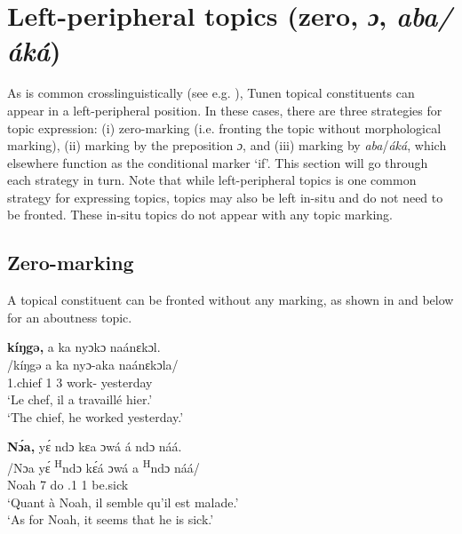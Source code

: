 \documentclass[output=paper,colorlinks,citecolor=brown
]{langscibook}
\begin{document}
\section{Left-peripheral topics (zero, \textit{ɔ},  \textit{aba/áká})}\label{sectopics}
As is common crosslinguistically (see e.g. \citealt{Gundel1988}), Tunen topical constituents can appear in a left-peripheral position. In these cases, there are three strategies for topic expression: (i) zero-marking (i.e. fronting the topic without morphological marking), (ii) marking by the preposition \textit{ɔ}, and (iii) marking by \textit{aba}/\textit{áká}, which elsewhere function as the conditional marker `if'. This section will go through each strategy in turn. Note that while left-peripheral topics is one common strategy for expressing topics, topics may also be left in-situ and do not need to be fronted. These in-situ topics do not appear with any topic marking.

\subsection{Zero-marking}
A topical constituent can be fronted without any marking, as shown  in  and  below for an aboutness topic.


\ea
\label{chieftop}
\glll
{\db}\textbf{kíŋgə,}	a ka	nyɔkɔ	naánɛkɔl. \\
/kíŋgə	a ka	nyɔ-aka	naánɛkɔla/ \\
{\db}1.chief	1\SM{} \PST{}3{} work-\DUR{}	yesterday \\
\glt
`Le chef, il a travaillé hier.' \\ `The chief, he worked yesterday.' \jambox*{[JO 2625] }

\z

\ea
\label{Noahtop}
\glll
{\db}\textbf{Nɔ́a,} yɛ́ ndɔ kɛa ɔwá á ndɔ náá. \\
/Nɔa yɛ́ \textsuperscript{H}ndɔ kɛ́á ɔwá a \textsuperscript{H}ndɔ náá/ \\
{\db}Noah 7\SM{} \PRS{} do \REL{}.1{} 1\SM{} \PRS{} be.sick \\
\glt
`Quant à Noah, il semble qu'il est malade.' \\ `As for Noah, it seems that he is sick.' \jambox*{[JO 1306]}
\end{document}
